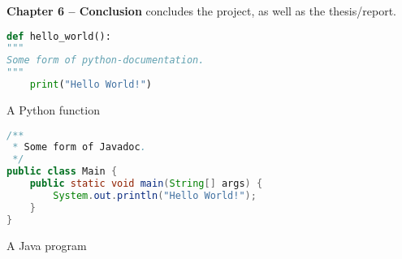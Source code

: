 \noindent\textbf{Chapter 6 -- Conclusion} concludes the project, as well as the thesis/report.











\begin{code}
\begin{lstlisting}[language=python]
def hello_world():
"""
Some form of python-documentation.
"""
    print("Hello World!")
\end{lstlisting}
\caption{A Python function}
\label{code:python}
\end{code}



\begin{code}
\begin{lstlisting}[language=java]
/**
 * Some form of Javadoc.
 */
public class Main {
    public static void main(String[] args) {
        System.out.println("Hello World!");
    }
}
\end{lstlisting}
\caption{A Java program}
\label{code:java}
\end{code}